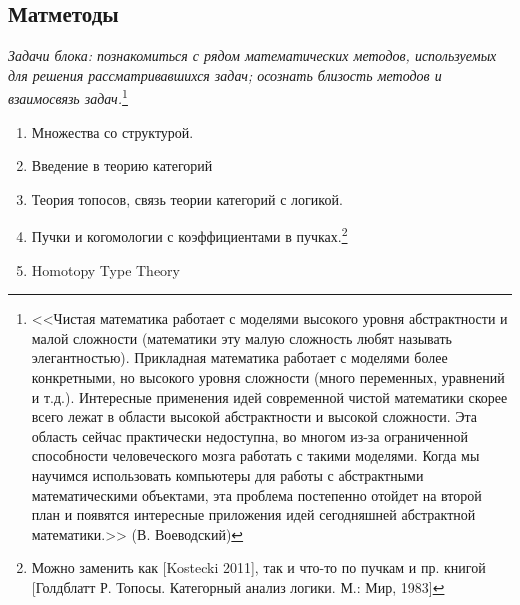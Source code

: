 \documentclass[a4paper,12pt]{article}
\begin{document}
\subsection{Матметоды}

\textit{Задачи блока: познакомиться с рядом математических методов, используемых для решения рассматривавшихся задач; осознать близость методов и взаимосвязь задач.}\footnote{<<Чистая математика работает с моделями высокого уровня абстрактности и малой сложности (математики эту малую сложность любят называть элегантностью).  Прикладная математика работает с моделями более конкретными, но высокого уровня сложности (много переменных, уравнений и т.д.). Интересные применения идей современной чистой математики скорее всего лежат в области высокой абстрактности и высокой сложности. Эта область сейчас практически недоступна, во многом из-за ограниченной способности человеческого мозга работать с такими моделями. Когда мы научимся использовать компьютеры для работы с абстрактными математическими объектами, эта проблема постепенно отойдет на второй план и появятся интересные приложения идей сегодняшней абстрактной математики.>> (В. Воеводский)}

\begin{enumerate}
  \item Множества со структурой. 
  \item Введение в теорию категорий 
  \item Теория топосов, связь теории категорий с логикой. 
  \item Пучки и когомологии с коэффициентами в пучках.\footnote{Можно заменить как [Kostecki 2011], так и что-то по пучкам и пр. книгой [Голдблатт Р. Топосы. Категорный анализ логики. М.: Мир, 1983]}
  \item Homotopy Type Theory 
\end{enumerate}
\end{document}
